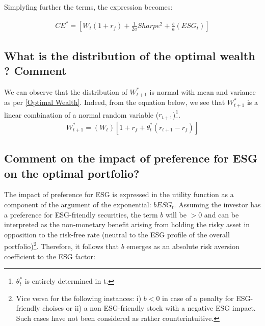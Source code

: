 \documentclass[12pt]{article}
\begin{document}
	Simplyfing further the terms, the expression becomes: \vspace{-1.75em}
	
	\begin{align}
		CE^* = [W_t(1 + r_f) + \frac{1}{2a}Sharpe^2 + \frac{b}{a}(ESG_t)] 
	\end{align} \vspace{-2.5em}
	
	\subsection{What is the distribution of the optimal wealth ? Comment}
	We can observe that the distribution of $W_{t+1}^{*}$ is normal with mean and variance as per \ref{Optimal Wealth}. Indeed, from the equation below, we see that $W_{t+1}^{*}$ is a linear combination of a normal random variable ($r_{t+1}$)\footnote {$\theta_t^*$ is entirely determined in t.}.
	\begin{align}
		W_{t+1}^{*} = (W_t) \left[1 + r_f + \theta_t^*(r_{t+1}-r_f) \right]
	\end{align} \vspace{-2.5em}
	
	\subsection{Comment on the impact of preference for ESG on the optimal portfolio?}
	
	The impact of preference for ESG is expressed in the utility function as a component of the argument of the exponential: $bESG_t$. 
	Assuming the investor has a preference for ESG-friendly securities, the term $b$ will be $> 0$ and can be interpreted as the non-monetary benefit arising from holding the risky asset in opposition to the risk-free rate (neutral to the ESG profile of the overall portfolio)\footnote {Vice versa for the following instances: i) $b < 0 $ in case of a penalty for ESG-friendly choises or ii) a non ESG-friendly stock with a negative ESG impact. Such cases have not been considered as rather counterintuitive.}. Therefore, it follows that $b$ emerges as an absolute risk aversion coefficient to the ESG factor:
	
\end{document}

